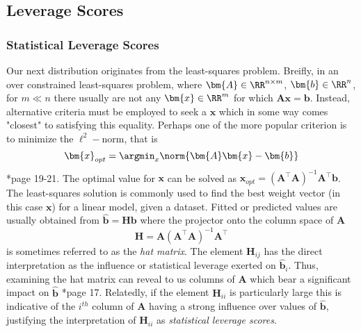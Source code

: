 \subsection{Leverage Scores}\label{Section2.3}

\subsubsection{Statistical Leverage Scores}
Our next distribution originates from the least-squares problem. Breifly, in an over constrained least-squares problem, where $\bm{A} \in \RR^{n \times m}$, $\bm{b} \in \RR^{n}$, for $m \ll n$ there usually are not any $\bm{x} \in \RR^{m}$ for which $\bm{A} \bm{x} = \bm{b}$. Instead, alternative criteria must be employed to seek a $\bm{x}$ which in some way comes "closest" to satisfying this equality. Perhaps one of the more popular criterion is to minimize the $\ell^2-$norm, that is
\[
    \bm{x}_{opt} = \argmin_{x} \norm{\bm{A} \bm{x} - \bm{b}}
\]
\cite{DBLP:journals/corr/abs-1104-5557}*{page 19-21}. The optimal value for $\bm{x}$ can be solved as $\bm{x}_{opt} = \left( \bm{A}^{\intercal} \bm{A} \right)^{-1} \bm{A}^{\intercal} \bm{b}$. The least-squares solution is commonly used to find the best weight vector (in this case $\bm{x}$) for a linear model, given a dataset. Fitted or predicted values are usually obtained from $\hat{\bm{b}} = \bm{H} \bm{b}$ where the projector onto the column space of $\bm{A}$
\[
    \bm{H} = \bm{A} \left( \bm{A}^{\intercal} \bm{A} \right)^{-1} \bm{A}^{\intercal}
\]
is sometimes referred to as the {\it hat matrix}. The element $\bm{H}_{ij}$ has the direct interpretation as the influence or statistical leverage exerted on $\hat{\bm{b}}_i$. Thus, examining the hat matrix can reveal to us columns of $\bm{A}$ which bear a significant impact on $\hat{\bm{b}}$ \cite{HoaglinDavidC1978THMi}*{page 17}. Relatedly, if the element $\bm{H}_{ii}$ is particularly large this is indicative of the $i^{th}$ column of $\bm{A}$ having a strong influence over values of $\hat{\bm{b}}$, justifying the interpretation of $\bm{H}_{ii}$ as {\it statistical leverage scores}.

